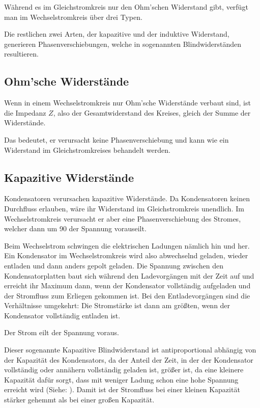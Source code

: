 Während es im Gleichstromkreis nur den Ohm'schen Widerstand gibt, verfügt man im Wechselstromkreis über drei Typen.

Die restlichen zwei Arten, der kapazitive und der induktive Widerstand, generieren Phasenverschiebungen, welche in sogenannten Blindwiderständen resultieren.


\subsection{Ohm'sche Widerstände}		\label{subsec:OhmscherWiderstand}

Wenn in einem Wechselstromkreis nur Ohm'sche Widerstände verbaut sind, ist die Impedanz $Z$, also der Gesamtwiderstand des Kreises, gleich der Summe der Widerstände.

Das bedeutet, er verursacht keine Phasenverschiebung und kann wie ein Widerstand im Gleichstromkreises behandelt werden.


\subsection{Kapazitive Widerstände}		\label{subsec:KapazitiverWiderstand}

Kondensatoren verursachen kapazitive Widerstände. Da Kondensatoren keinen Durchfluss erlauben, wäre ihr Widerstand im Gleichstromkreis unendlich. Im Wechselstromkreis verursacht er aber eine Phasenverschiebung des Stromes, welcher dann um 90\degree{} der Spannung vorauseilt.

Beim Wechselstrom schwingen die elektrischen Ladungen nämlich hin und her. Ein Kondensator im Wechselstromkreis wird also abwechselnd geladen, wieder entladen und dann anders gepolt geladen. Die Spannung zwischen den Kondensatorplatten baut sich während den Ladevorgängen mit der Zeit auf und erreicht ihr Maximum dann, wenn der Kondensator vollständig aufgeladen und der Stromfluss zum Erliegen gekommen ist. Bei den Entladevorgängen sind die Verhältnisse umgekehrt: Die Stromstärke ist dann am größten, wenn der Kondensator vollständig entladen ist.

\glqq Der Strom eilt der Spannung voraus.\grqq

\vspace{11pt}

\noindent Dieser sogenannte \glqq Kapazitive Blindwiderstand\grqq{} ist antiproportional abhängig von der Kapazität des Kondensators, da der Anteil der Zeit, in der der Kondensator vollständig oder annähern vollständig geladen ist, größer ist, da eine kleinere Kapazität dafür sorgt, dass mit weniger Ladung schon eine hohe Spannung erreicht wird (Siehe: ). Damit ist der Stromfluss bei einer kleinen Kapazität stärker gehemmt als bei einer großen Kapazität. 

